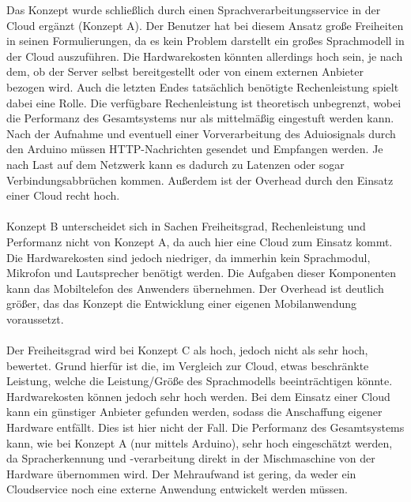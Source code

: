 Das Konzept wurde schließlich durch einen Sprachverarbeitungsservice in der Cloud ergänzt (Konzept A).
Der Benutzer hat bei diesem Ansatz große Freiheiten in seinen Formulierungen, da es kein Problem darstellt ein großes Sprachmodell in der Cloud auszuführen.
Die Hardwarekosten könnten allerdings hoch sein, je nach dem, ob der Server selbst bereitgestellt oder von einem externen Anbieter bezogen wird.
Auch die letzten Endes tatsächlich benötigte Rechenleistung spielt dabei eine Rolle.
Die verfügbare Rechenleistung ist theoretisch unbegrenzt, wobei die Performanz des Gesamtsystems nur als mittelmäßig eingestuft werden kann.
Nach der Aufnahme und eventuell einer Vorverarbeitung des Aduiosignals durch den Arduino müssen \ac{HTTP}-Nachrichten gesendet und Empfangen werden.
Je nach Last auf dem Netzwerk kann es dadurch zu Latenzen oder sogar Verbindungsabbrüchen kommen.
Außerdem ist der Overhead durch den Einsatz einer Cloud recht hoch.\\\\
Konzept B unterscheidet sich in Sachen Freiheitsgrad, Rechenleistung und Performanz nicht von Konzept A, da auch hier eine Cloud zum Einsatz kommt.
Die Hardwarekosten sind jedoch niedriger, da immerhin kein Sprachmodul, Mikrofon und Lautsprecher benötigt werden.
Die Aufgaben dieser Komponenten kann das Mobiltelefon des Anwenders übernehmen.
Der Overhead ist deutlich größer, das das Konzept die Entwicklung einer eigenen Mobilanwendung voraussetzt.\\\\
Der Freiheitsgrad wird bei Konzept C als hoch, jedoch nicht als sehr hoch, bewertet.
Grund hierfür ist die, im Vergleich zur Cloud, etwas beschränkte Leistung, welche die Leistung/Größe des Sprachmodells beeinträchtigen könnte.
Hardwarekosten können jedoch sehr hoch werden.
Bei dem Einsatz einer Cloud kann ein günstiger Anbieter gefunden werden, sodass die Anschaffung eigener Hardware entfällt.
Dies ist hier nicht der Fall.
Die Performanz des Gesamtsystems kann, wie bei Konzept A (nur mittels Arduino), sehr hoch eingeschätzt werden, da Spracherkennung und -verarbeitung direkt in der Mischmaschine von der Hardware übernommen wird.
Der Mehraufwand ist gering, da weder ein Cloudservice noch eine externe Anwendung entwickelt werden müssen.
\endinput



